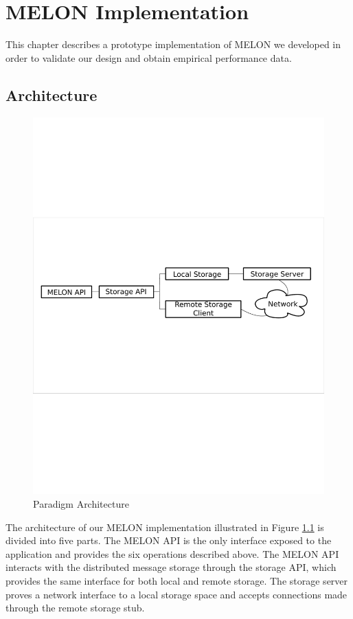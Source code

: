 \chapter{MELON Implementation}\label{chapter:implementation}

This chapter describes a prototype implementation of MELON we developed in order to validate our design and obtain empirical performance data.

\section{Architecture}

\begin{figure}
\centering
\includegraphics[scale = .70, clip, trim = 10px 280px 10px 250px]{figures/paradigm_arch.pdf}
\caption{Paradigm Architecture}
\label{fig:architecture}
\end{figure}

The architecture of our MELON implementation illustrated in Figure \ref{fig:architecture} is divided into five parts. The MELON API is the only interface exposed to the application and provides the six operations described above. The MELON API interacts with the distributed message storage through the storage API, which provides the same interface for both local and remote storage. The storage server proves a network interface to a local storage space and accepts connections made through the remote storage stub.

